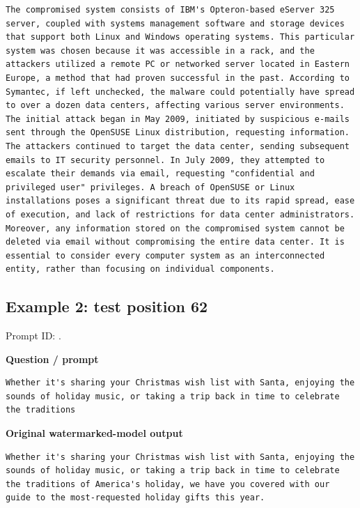 \begin{Verbatim}
The compromised system consists of IBM's Opteron-based eServer 325 server, coupled with systems management software and storage devices that support both Linux and Windows operating systems. This particular system was chosen because it was accessible in a rack, and the attackers utilized a remote PC or networked server located in Eastern Europe, a method that had proven successful in the past. According to Symantec, if left unchecked, the malware could potentially have spread to over a dozen data centers, affecting various server environments. The initial attack began in May 2009, initiated by suspicious e-mails sent through the OpenSUSE Linux distribution, requesting information. The attackers continued to target the data center, sending subsequent emails to IT security personnel. In July 2009, they attempted to escalate their demands via email, requesting "confidential and privileged user" privileges. A breach of OpenSUSE or Linux installations poses a significant threat due to its rapid spread, ease of execution, and lack of restrictions for data center administrators. Moreover, any information stored on the compromised system cannot be deleted via email without compromising the entire data center. It is essential to consider every computer system as an interconnected entity, rather than focusing on individual components.
\end{Verbatim}

\subsection{Example 2: test position
62}\label{record-docs-watermarking-qualitative-paper-kgw-vanilla-md-example-2-test-position-62}

Prompt ID:
\texttt{}.

\textbf{Question / prompt}

\begin{Verbatim}
Whether it's sharing your Christmas wish list with Santa, enjoying the sounds of holiday music, or taking a trip back in time to celebrate the traditions
\end{Verbatim}

\textbf{Original watermarked-model output}

\begin{Verbatim}
Whether it's sharing your Christmas wish list with Santa, enjoying the sounds of holiday music, or taking a trip back in time to celebrate the traditions of America's holiday, we have you covered with our guide to the most-requested holiday gifts this year.
\end{Verbatim}

